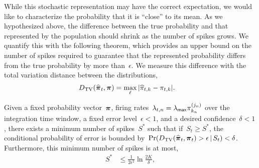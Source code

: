 While this stochastic representation may have the correct expectation, we
would like to characterize the probability that it is ``close'' to its
mean. As we hypothesized above, the difference between the true
probability and that represented by the population should shrink as
the number of spikes grows. We quantify this with the following
theorem, which provides an upper bound on the number of spikes
required to guarantee that the represented probability differs from
the true probability by more than~$\epsilon$. We measure this
difference with the total variation distance between the
distributions,
\begin{align}
  {D_{\mathrm{TV}}}(\widehat{\boldsymbol{\pi}}_t, \boldsymbol{\pi}) &= 
  \max_{\ell} |\widehat{\pi}_{t,k} - \pi_{t,k}|.
\end{align}

\begin{theorem}
\label{thm:fixed_count}
Given a fixed probability vector~$\boldsymbol{\pi}$, firing
rates~$\lambda_{t,n} = \lambda_{\mathsf{max}} \pi_{k_n}^{(j_n)}$ over the integration
time window, a fixed error level~$\epsilon < 1$, and a desired
confidence~$\delta < 1$, there exists a minimum number of spikes~$S^*$
such that if~$S_t \geq S^*$, the conditional probability of error is
bounded
by~$\Pr({D_{\mathrm{TV}}}(\widehat{\boldsymbol{\pi}}_t, \boldsymbol{\pi}_t) > \epsilon \,|\, S_t) <
\delta$.  Furthermore, this minimum number of spikes is at most,
\begin{align}
S^* &\leq \frac{1}{2\epsilon^2} \ln \frac{2K}{\delta},  
\end{align}
\end{theorem}

